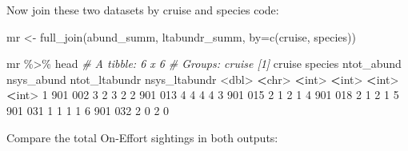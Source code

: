 \documentclass[
]{book}
\newenvironment{Shaded}{\begin{snugshade}}{\end{snugshade}}
\newcommand{\AttributeTok}[1]{\textcolor[rgb]{0.77,0.63,0.00}{#1}}
\newcommand{\CommentTok}[1]{\textcolor[rgb]{0.56,0.35,0.01}{\textit{#1}}}
\newcommand{\ConstantTok}[1]{\textcolor[rgb]{0.00,0.00,0.00}{#1}}
\newcommand{\DecValTok}[1]{\textcolor[rgb]{0.00,0.00,0.81}{#1}}
\newcommand{\ErrorTok}[1]{\textcolor[rgb]{0.64,0.00,0.00}{\textbf{#1}}}
\newcommand{\FunctionTok}[1]{\textcolor[rgb]{0.00,0.00,0.00}{#1}}
\newcommand{\NormalTok}[1]{#1}
\newcommand{\OtherTok}[1]{\textcolor[rgb]{0.56,0.35,0.01}{#1}}
\newcommand{\SpecialCharTok}[1]{\textcolor[rgb]{0.00,0.00,0.00}{#1}}
\newcommand{\StringTok}[1]{\textcolor[rgb]{0.31,0.60,0.02}{#1}}
\begin{document}
Now join these two datasets by cruise and species code:

\begin{Shaded}
\begin{Highlighting}[]
\NormalTok{mr }\OtherTok{\textless{}{-}} \FunctionTok{full\_join}\NormalTok{(abund\_summ, ltabundr\_summ, }\AttributeTok{by=}\FunctionTok{c}\NormalTok{(}\StringTok{\textquotesingle{}cruise\textquotesingle{}}\NormalTok{, }\StringTok{\textquotesingle{}species\textquotesingle{}}\NormalTok{))}

\NormalTok{mr }\SpecialCharTok{\%\textgreater{}\%}\NormalTok{ head}
\CommentTok{\# A tibble: 6 x 6}
\CommentTok{\# Groups:   cruise [1]}
\NormalTok{  cruise species ntot\_abund nsys\_abund ntot\_ltabundr nsys\_ltabundr}
   \SpecialCharTok{\textless{}}\NormalTok{dbl}\SpecialCharTok{\textgreater{}} \ErrorTok{\textless{}}\NormalTok{chr}\SpecialCharTok{\textgreater{}}        \ErrorTok{\textless{}}\NormalTok{int}\SpecialCharTok{\textgreater{}}      \ErrorTok{\textless{}}\NormalTok{int}\SpecialCharTok{\textgreater{}}         \ErrorTok{\textless{}}\NormalTok{int}\SpecialCharTok{\textgreater{}}         \ErrorTok{\textless{}}\NormalTok{int}\SpecialCharTok{\textgreater{}}
\DecValTok{1}    \DecValTok{901} \DecValTok{002}              \DecValTok{3}          \DecValTok{2}             \DecValTok{3}             \DecValTok{2}
\DecValTok{2}    \DecValTok{901} \DecValTok{013}              \DecValTok{4}          \DecValTok{4}             \DecValTok{4}             \DecValTok{4}
\DecValTok{3}    \DecValTok{901} \DecValTok{015}              \DecValTok{2}          \DecValTok{1}             \DecValTok{2}             \DecValTok{1}
\DecValTok{4}    \DecValTok{901} \DecValTok{018}              \DecValTok{2}          \DecValTok{1}             \DecValTok{2}             \DecValTok{1}
\DecValTok{5}    \DecValTok{901} \DecValTok{031}              \DecValTok{1}          \DecValTok{1}             \DecValTok{1}             \DecValTok{1}
\DecValTok{6}    \DecValTok{901} \DecValTok{032}              \DecValTok{2}          \DecValTok{0}             \DecValTok{2}             \DecValTok{0}
\end{Highlighting}
\end{Shaded}

Compare the total On-Effort sightings in both outputs:

\begin{Shaded}
\end{Shaded}
\end{document}
